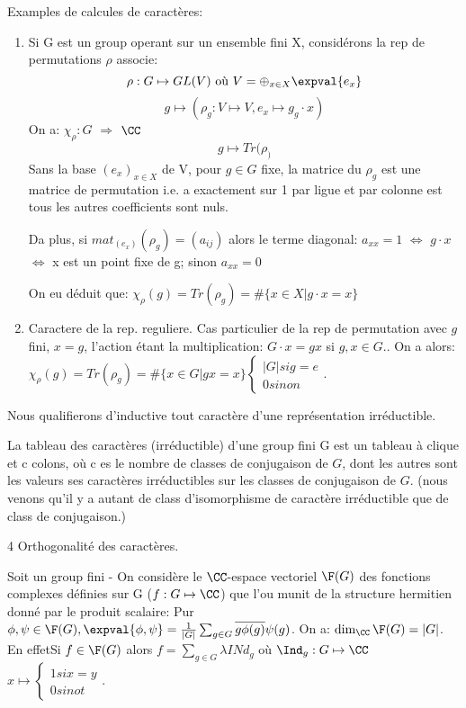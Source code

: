Examples de calcules de caractères:
\begin{enumerate}
	\item Si G est un group operant sur un ensemble fini X, considérons la rep de permutations $\rho$ associe:
	$$\rho:G\mapsto GL(V)\mbox{ où }V=\oplus_{x\in X}\expval{e_x}$$
	$$g\mapsto(\rho_g:V\mapsto V, e_x\mapsto g_g\cdot x)$$
	On a:
	$\chi_\rho:G$ $\Rightarrow$ $\CC$
	$$g\mapsto Tr(\rho_)$$
	Sans la base $(e_x)_{x\in X}$ de V, pour $g\in G$ fixe, la matrice du $\rho_g$ est une matrice de permutation i.e. a exactement sur 1 par ligue et par colonne est tous les autres coefficients sont nuls.
	
	Da plus, si $mat_{(e_x)}(\rho_g)=(a_{ij})$ alors le terme diagonal: $a_{xx}=1$  $\Leftrightarrow$   $g\cdot x$  $\Leftrightarrow$  x est un point fixe de g; sinon $a_{xx}=0$
	
	On eu déduit que: $\chi_\rho(g)=Tr(\rho_g)=\#\{x\in X | g\cdot x= x\}$
	\item Caractere de la rep. reguliere.
	Cas particulier de la rep de permutation avec $g$ fini, $x=g$, l'action étant la multiplication: $G\cdot x=gx$ si $g,x\in G.$.
	On a alors: $\chi_\rho(g)=Tr(\rho_g)=\#\{x\in G|gx=x\}\left\{\begin{array}{l}|G| si g=e\\0 sinon\end{array}\right.$.
\end{enumerate}


\begin{definition}
	Nous qualifierons d'inductive tout caractère d'une représentation irréductible.
\end{definition}
	
	La tableau des caractères (irréductible) d'une group fini G est un tableau  à clique et c colons, où c es le nombre de classes de conjugaison de $G$, dont les autres sont les valeurs ses caractères irréductibles sur les classes de conjugaison de $G$. (nous venons qu'il y a autant de class d'isomorphisme de caractère irréductible que de class de conjugaison.)
	
4 Orthogonalité des caractères.

Soit  un group fini - On considère le $\CC$-espace vectoriel $\F (G)$ des fonctions complexes définies sur G ($f:G\mapsto  \CC$) que l'ou munit de la structure hermitien donné par le produit scalaire:
Pur $\phi,\psi\in\F(G), \expval{\phi,\psi}=\frac 1{|G|}\sum_{g\in G}\overline{g\phi(g)}\psi(g)$. On a: $\dim_\CC\F(G)=|G|$.
En effetSi $f\in\F(G)$ alors $f=\sum_{g\in G}\lambda INd_g$ où $\Ind_g:G\mapsto \CC$ $x\mapsto \left\{\begin{array}{l}1 si x=y\\0 sinot\end{array}\right.$.

